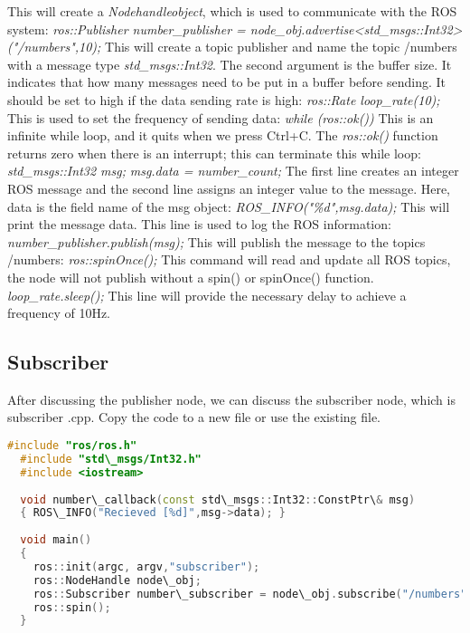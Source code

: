  This will create a \textit{Nodehandleobject}, which is used to communicate with the ROS system:
 \textit{ ros::Publisher number\_publisher = node\_obj.advertise<std\_msgs::Int32>("/numbers",10);} 
 This will create a topic publisher and name the topic /numbers with a message type \textit{std\_msgs::Int32}. The second argument is the buffer size. It indicates that how many messages need to be put in a buffer before sending. It should be set to high if the data sending rate is high: \textit{ros::Rate loop\_rate(10);} This is used to set the frequency of sending data:\textit{ while (ros::ok()) } This is an infinite while loop, and it quits when we press Ctrl+C. The\textit{ ros::ok()} function returns zero when there is an interrupt; this can terminate this while loop:
 \textit{std\_msgs::Int32 msg;} 
 \textit{msg.data = number\_count;} 
 The first line creates an integer ROS message and the second line assigns an integer value to the message.
 Here, data is the field name of the msg object:\textit{ ROS\_INFO("\%d",msg.data);} This will print the message data. This line is used to log the ROS information: \textit{number\_publisher.publish(msg);}
 This will publish the message to the topics /numbers:\textit{ ros::spinOnce();} 
 This command will read and update all ROS topics, the node will not publish without a spin() or spinOnce() function.
 \textit{ loop\_rate.sleep();}
 This line will provide the necessary delay to achieve a frequency of 10Hz.

 
 \subsection{Subscriber}
 
  After discussing the publisher node, we can discuss the subscriber node, which is subscriber .cpp. Copy the code to a new file or use the existing file.
  \begin{lstlisting}[language=CPP]
  #include "ros/ros.h"
  #include "std\_msgs/Int32.h"
  #include <iostream>
  
  void number\_callback(const std\_msgs::Int32::ConstPtr\& msg) 
  { ROS\_INFO("Recieved [%d]",msg->data); }
  
  void main()
  {
 	ros::init(argc, argv,"subscriber");
  	ros::NodeHandle node\_obj;
  	ros::Subscriber number\_subscriber = node\_obj.subscribe("/numbers",10,number\_callback);
  	ros::spin();
  }
  
  \end{lstlisting}
  
